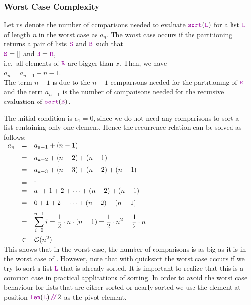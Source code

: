 \subsubsection{Worst Case Complexity}
Let us denote the number of comparisons needed to evaluate $\mytt{sort}(\mytt{L})$ for a list $\mytt{L}$ of
length $n$ in the worst case as $a_n$.  The worst case occurs if the partitioning
returns a pair of lists $\mytt{S}$ and $\mytt{B}$ such that
\\[0.2cm]
\hspace*{1.3cm}
$\mytt{S} = []$ \quad and \quad $\mytt{B} = \mytt{R}$,
\\[0.2cm]
i.e.~all elements of $\mytt{R}$ are bigger than $x$.  Then, we have
\\[0.2cm]
\hspace*{1.3cm}
$a_n = a_{n-1} + n - 1$. 
\\[0.2cm]
The term $n-1$ is due to the $n-1$ comparisons needed for the partitioning of $\mytt{R}$
and the term $a_{n-1}$ is the number of comparisons needed for the recursive evaluation of $\mytt{sort}(\mytt{B})$.

The initial condition is $a_1 = 0$, since we do not need any comparisons to sort a list
containing only one element.
Hence the recurrence relation can be solved as follows:
\\[0.2cm]
\hspace*{1.3cm}
$
\begin{array}{lcl}
  a_n & = & a_{n-1} + (n-1) \\[0.2cm]
      & = & a_{n-2} + (n-2) + (n-1) \\[0.2cm]
      & = & a_{n-3} + (n-3) + (n-2) + (n-1) \\
      & = & \vdots \\
      & = & a_{1} + 1 + 2 + \cdots  + (n-2) + (n-1) \\[0.2cm]
      & = & 0 + 1 + 2 + \cdots  + (n-2) + (n-1) \\[0.2cm]
      & = & \displaystyle \sum\limits_{i=0}^{n-1} i  =  \frac{1}{2} \cdot n \cdot(n - 1) =
            \frac{1}{2} \cdot n^2 - \frac{1}{2} \cdot n \\[0.5cm]
      & \in & \mathcal{O}(n^2)
\end{array}
$
\\[0.2cm]
This shows that in the worst case, the number of comparisons is as big as it is in the worst case of 
.  However, note that with quicksort the worst case occurs if we try to sort a list
$\mytt{L}$ that is already sorted.  It is important to realize that this is a common case in practical
applications of sorting.  In order to avoid the worst case behaviour for lists that are either sorted or nearly
sorted we use the element at position $\mytt{len}(\mytt{L})\dv 2$ as the pivot element.


